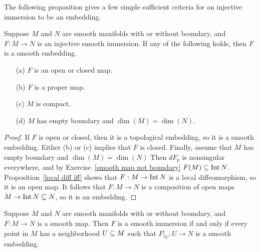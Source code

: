 The following proposition gives a few simple sufficient criteria for an injective immersion to be an embedding.
\begin{proposition}\label{smooth embedd if}
Suppose $M$ and $N$ are smooth manifolds with or without boundary, and $F:M\to N$ is an injective smooth immersion. If any of the following holds, then $F$ is a smooth embedding.
\begin{itemize}
\item[(a)] $F$ is an open or closed map.
\item[(b)] $F$ is a proper map.
\item[(c)] $M$ is compact.
\item[(d)] $M$ has empty boundary and $\dim(M)=\dim(N)$.
\end{itemize}
\end{proposition}
\begin{proof}
If $F$ is open or closed, then it is a topological embedding, so it is a smooth embedding. Either (b) or (c) implies that $F$ is closed. Finally, assume that $M$ has empty boundary and $\dim(M)=\dim(N)$ Then $dF_p$ is nonsingular everywhere, and by Exercise~\ref{smooth map not boundary} $F(M)\subseteq\mathrm{Int}\, N$. Proposition~\ref{local diff iff} shows that $F:M\to\mathrm{Int}\, N$ is a local diffeomorphism, so it is an open map. It follows that $F:M\to N$ is a composition of open maps $M\to\mathrm{Int}\, N\subseteq N$, so it is an embedding.
\end{proof}
\begin{theorem}\label{immersion local embedding}
Suppose $M$ and $N$ are smooth manifolds with or without boundary, and $F:M\to N$ is a smooth map. Then $F$ is a smooth immersion if and only if every point in $M$ has a neighborhood $U\subseteq M$ such that $F|_U:U\to N$ is a smooth embedding.
\end{theorem}
